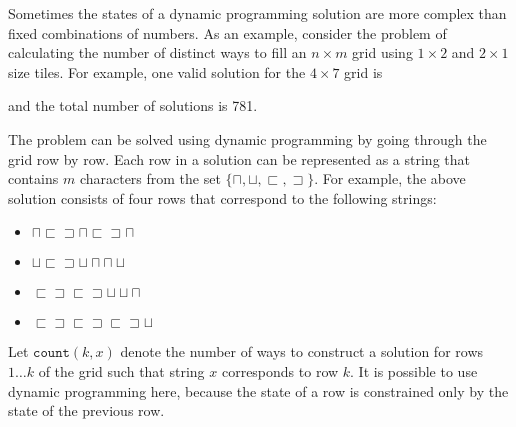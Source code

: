 Sometimes the states of a dynamic programming solution
are more complex than fixed combinations of numbers.
As an example,
consider the problem of calculating
the number of distinct ways to
fill an $n \times m$ grid using
$1 \times 2$ and $2 \times 1$ size tiles.
For example, one valid solution
for the $4 \times 7$ grid is
\begin{center}
\end{center}
and the total number of solutions is 781.

The problem can be solved using dynamic programming
by going through the grid row by row.
Each row in a solution can be represented as a
string that contains $m$ characters from the set
$\{\sqcap, \sqcup, \sqsubset, \sqsupset \}$.
For example, the above solution consists of four rows
that correspond to the following strings:
\begin{itemize}
\item
$\sqcap \sqsubset \sqsupset \sqcap \sqsubset \sqsupset \sqcap$
\item
$\sqcup \sqsubset \sqsupset \sqcup \sqcap \sqcap \sqcup$
\item
$\sqsubset \sqsupset \sqsubset \sqsupset \sqcup \sqcup \sqcap$ 
\item
$\sqsubset \sqsupset \sqsubset \sqsupset \sqsubset \sqsupset \sqcup$
\end{itemize}

Let $\texttt{count}(k,x)$ denote the number of ways to
construct a solution for rows $1 \ldots k$
of the grid such that string $x$ corresponds to row $k$.
It is possible to use dynamic programming here,
because the state of a row is constrained
only by the state of the previous row.

